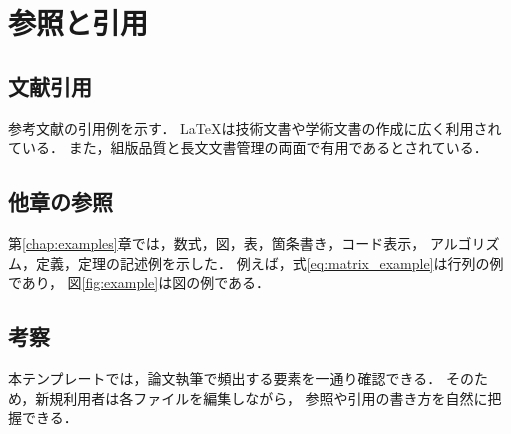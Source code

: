 
\chapter{参照と引用}
\label{chap:reference_and_citation}

\section{文献引用}
\label{sec:citation}

参考文献の引用例を示す．
\LaTeX{}は技術文書や学術文書の作成に広く利用されている\cite{lamport1994latex}．
また，組版品質と長文文書管理の両面で有用であるとされている\cite{mittelbach2004latex}．

\section{他章の参照}
\label{sec:cross_reference}

第\ref{chap:examples}章では，数式，図，表，箇条書き，コード表示，
アルゴリズム，定義，定理の記述例を示した．
例えば，式\ref{eq:matrix_example}は行列の例であり，
図\ref{fig:example}は図の例である．

\section{考察}
\label{sec:discussion}

本テンプレートでは，論文執筆で頻出する要素を一通り確認できる．
そのため，新規利用者は各ファイルを編集しながら，
参照や引用の書き方を自然に把握できる．
